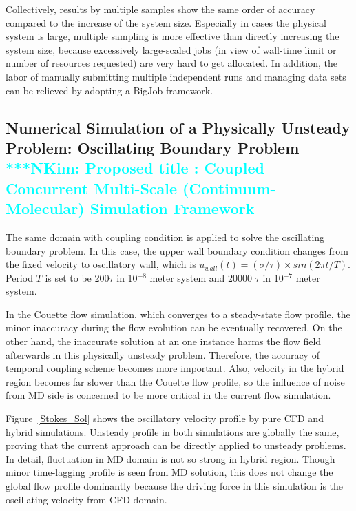 \documentclass[preprint,12pt]{elsarticle}
\newcommand{\Nkimnote}[1]{ {\textcolor{cyan} { ***NKim: #1 }}}
\newcommand{\Nkimnote}[1]{}
\begin{document}
Collectively, results by multiple samples show the same order of accuracy compared to the increase of the system size. Especially in cases the physical system is large, multiple sampling is more effective than directly increasing the system size, because excessively large-scaled jobs (in view of wall-time limit or number of resources requested) are very hard to get allocated. In addition, the labor of manually submitting multiple independent runs and managing data sets can be relieved by adopting a BigJob framework.


\subsection{Numerical Simulation of a Physically Unsteady Problem: Oscillating Boundary Problem
\\
\Nkimnote{Proposed title : Coupled Concurrent Multi-Scale (Continuum-Molecular) Simulation Framework}}

The same domain with coupling condition is applied to solve the oscillating boundary problem. In this case, the upper wall boundary condition changes from the fixed velocity to oscillatory wall, which is $u_{wall}(t)=({\sigma}/{\tau}){\times}sin(2{\pi}t/T)$. Period $T$ is set to be 200$\tau$ in 10$^{-8}$ meter system and 20000 $\tau$ in 10$^{-7}$ meter system. 

In the Couette flow simulation, which converges to a steady-state flow profile, the minor inaccuracy during the flow evolution can be eventually recovered. On the other hand, the inaccurate solution at an one instance harms the flow field afterwards in this physically unsteady problem. Therefore, the accuracy of temporal coupling scheme becomes more important. Also, velocity in the hybrid region becomes far slower than the Couette flow profile, so the influence of noise from MD side is concerned to be more critical in the current flow simulation.

Figure~\ref{Stokes_Sol} shows the oscillatory velocity profile by pure CFD and hybrid simulations. Unsteady profile in both simulations are globally the same, proving that the current approach can be directly applied to unsteady problems. In detail, fluctuation in MD domain is not so strong in hybrid region. Though minor time-lagging profile is seen from MD solution, this does not change the global flow profile dominantly because the driving force in this simulation is the oscillating velocity from CFD domain.
\end{document}
